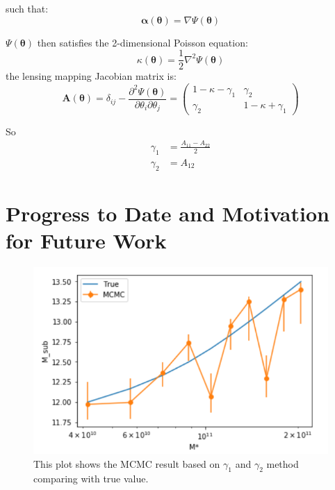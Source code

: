 \documentclass[12pt]{article}
\begin{document}
\begin{small}
such that:
\begin{equation}
    \bm{\alpha}(\bm{\theta}) =\nabla \Psi(\bm{\theta})
\end{equation}

$\Psi(\bm{\theta})$ then satisfies the 2-dimensional Poisson equation:
\begin{equation}
    \kappa(\bm{\theta}) = \frac{1}{2}\nabla^2 \Psi(\bm{\theta})
\end{equation}
the lensing mapping Jacobian matrix is:
\begin{equation}
    \mathcal{\bm{A}}(\bm{\theta}) = \delta_{ij} - \frac{\partial^2\Psi(\bm{\theta})}{\partial\theta_i\partial\theta_j} = \begin{pmatrix}
1-\kappa -\gamma_1 & \gamma_2 \\
\gamma_2 & 1-\kappa +\gamma_1
\end{pmatrix}
\end{equation}

So 
\begin{align}
    \gamma_1 &= \frac{A_{11}-A_{22}}{2} \\
    \gamma_2 &= A_{12}
\end{align}


\section{Progress to Date and Motivation for Future Work}


\begin{figure}
 \includegraphics[width=\textwidth]{Fig1.png}
 \caption{This plot shows the MCMC result based on $\gamma_1$ and $\gamma_2$ method comparing with true value.
}
 \label{SM_HM_fig}
\end{figure}





\end{small}
\end{document}

